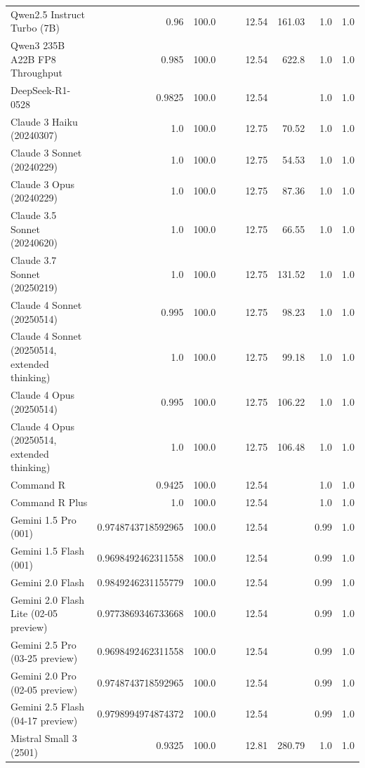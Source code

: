 \begin{table}[htp]
{\begin{tabular}{lrrrrrrrr}
Qwen2.5 Instruct Turbo (7B) & 0.96 & 100.0 &  &  & 12.54 & 161.03 & 1.0 & 1.0 \\
Qwen3 235B A22B FP8 Throughput & 0.985 & 100.0 &  &  & 12.54 & 622.8 & 1.0 & 1.0 \\
DeepSeek-R1-0528 & 0.9825 & 100.0 &  &  & 12.54 &  & 1.0 & 1.0 \\
Claude 3 Haiku (20240307) & 1.0 & 100.0 &  &  & 12.75 & 70.52 & 1.0 & 1.0 \\
Claude 3 Sonnet (20240229) & 1.0 & 100.0 &  &  & 12.75 & 54.53 & 1.0 & 1.0 \\
Claude 3 Opus (20240229) & 1.0 & 100.0 &  &  & 12.75 & 87.36 & 1.0 & 1.0 \\
Claude 3.5 Sonnet (20240620) & 1.0 & 100.0 &  &  & 12.75 & 66.55 & 1.0 & 1.0 \\
Claude 3.7 Sonnet (20250219) & 1.0 & 100.0 &  &  & 12.75 & 131.52 & 1.0 & 1.0 \\
Claude 4 Sonnet (20250514) & 0.995 & 100.0 &  &  & 12.75 & 98.23 & 1.0 & 1.0 \\
Claude 4 Sonnet (20250514, extended thinking) & 1.0 & 100.0 &  &  & 12.75 & 99.18 & 1.0 & 1.0 \\
Claude 4 Opus (20250514) & 0.995 & 100.0 &  &  & 12.75 & 106.22 & 1.0 & 1.0 \\
Claude 4 Opus (20250514, extended thinking) & 1.0 & 100.0 &  &  & 12.75 & 106.48 & 1.0 & 1.0 \\
Command R & 0.9425 & 100.0 &  &  & 12.54 &  & 1.0 & 1.0 \\
Command R Plus & 1.0 & 100.0 &  &  & 12.54 &  & 1.0 & 1.0 \\
Gemini 1.5 Pro (001) & 0.9748743718592965 & 100.0 &  &  & 12.54 &  & 0.99 & 1.0 \\
Gemini 1.5 Flash (001) & 0.9698492462311558 & 100.0 &  &  & 12.54 &  & 0.99 & 1.0 \\
Gemini 2.0 Flash & 0.9849246231155779 & 100.0 &  &  & 12.54 &  & 0.99 & 1.0 \\
Gemini 2.0 Flash Lite (02-05 preview) & 0.9773869346733668 & 100.0 &  &  & 12.54 &  & 0.99 & 1.0 \\
Gemini 2.5 Pro (03-25 preview) & 0.9698492462311558 & 100.0 &  &  & 12.54 &  & 0.99 & 1.0 \\
Gemini 2.0 Pro (02-05 preview) & 0.9748743718592965 & 100.0 &  &  & 12.54 &  & 0.99 & 1.0 \\
Gemini 2.5 Flash (04-17 preview) & 0.9798994974874372 & 100.0 &  &  & 12.54 &  & 0.99 & 1.0 \\
Mistral Small 3 (2501) & 0.9325 & 100.0 &  &  & 12.81 & 280.79 & 1.0 & 1.0 \\

\end{tabular}}
\end{table}
